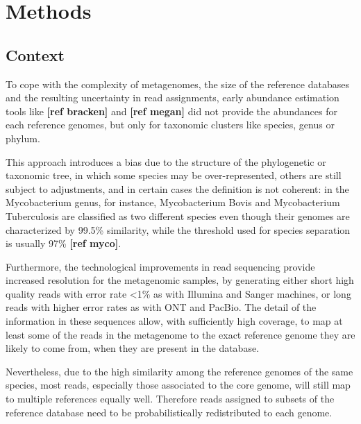 
\chapter{Methods}
\label{Chapter3}

\section{Context}

To cope with the complexity of metagenomes, the size of the reference databases and the resulting uncertainty in read assignments, early abundance estimation tools like \textbf{[ref bracken]} and \textbf{[ref megan]} did not provide the abundances for each reference genomes, but only for taxonomic clusters like species, genus or phylum.

This approach introduces a bias due to the structure of the phylogenetic or taxonomic tree, in which some species may be over-represented, others are still subject to adjustments, and in certain cases the definition is not coherent: in the Mycobacterium genus, for instance, Mycobacterium Bovis and Mycobacterium Tuberculosis are classified as two different species even though their genomes are characterized by 99.5\% similarity, while the threshold used for species separation is usually 97\% \textbf{[ref myco]}.

Furthermore, the technological improvements in read sequencing provide increased resolution for the metagenomic samples, by generating either short high quality reads with error rate <1\% as with Illumina and Sanger machines, or long reads with higher error rates as with ONT and PacBio. The detail of the information in these sequences allow, with sufficiently high coverage, to map at least some of the reads in the metagenome to the exact reference genome they are likely to come from, when they are present in the database.

Nevertheless, due to the high similarity among the reference genomes of the same species, most reads, especially those associated to the core genome, will still map to multiple references equally well. Therefore reads assigned to subsets of the reference database need to be probabilistically redistributed to each genome.

